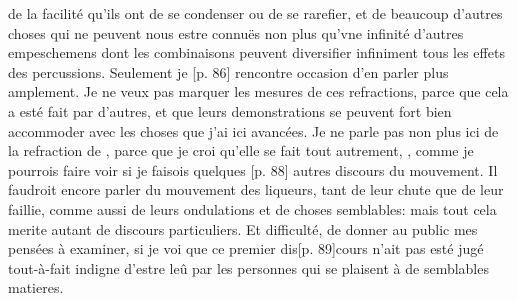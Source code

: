 \pend 
\count{}
\count{}
\pstart  
[p. 85] [...] de la facilit\'{e} qu'ils ont de se condenser ou de se rarefier, et de beaucoup d'autres choses qui ne peuvent nous estre connu\"{e}s non plus qu'vne infinit\'{e} d'autres empeschemens dont les combinaisons peuvent diversifier infiniment tous les effets des percussions. Seulement je [p. 86] rencontre occasion d'en parler plus amplement.
\pend 
\count{}
\pstart  
[p. 87] Je ne veux pas marquer les mesures de ces refractions, parce que cela a est\'{e} fait par d'autres, et que leurs demonstrations se peuvent fort bien accommoder avec les choses que j'ai ici avanc\'{e}es. Je ne parle pas non plus ici de la refraction de , parce que je croi qu'elle se fait tout autrement, , comme je pourrois faire voir si je faisois quelques [p. 88] autres discours du mouvement.
\pend 
\pstart  
[p. 88] Il faudroit encore parler du mouvement des liqueurs, tant de leur chute que de leur faillie, comme aussi de leurs ondulations et de choses semblables: mais tout cela merite autant de discours particuliers. Et  difficult\'{e}, de donner au public mes pens\'{e}es \`{a} examiner, si je voi que ce premier dis[p. 89]cours n'ait pas est\'{e} jug\'{e} tout-\`{a}-fait indigne d'estre le\^{u} par les personnes qui se plaisent \`{a} de semblables matieres.
